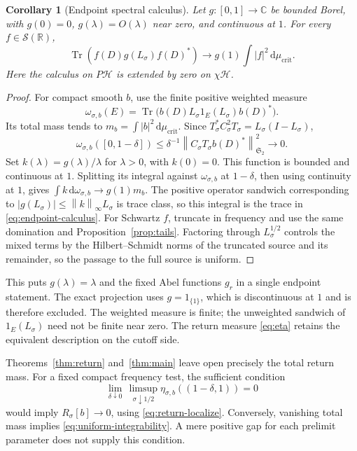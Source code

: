 \documentclass[11pt]{article}
\numberwithin{equation}{section}
\newtheorem{corollary}[theorem]{Corollary}
\theoremstyle{definition}
\theoremstyle{remark}
\newcommand{\HH}{\mathcal H}
\newcommand{\Sch}{\mathcal S}
\newcommand{\Tr}{\operatorname{Tr}}
\newcommand{\Id}{I}
\newcommand{\Stwo}{\mathfrak S_2}
\newcommand{\norm}[1]{\left\lVert #1\right\rVert}
\newcommand{\dd}{\,\mathrm d}
\newcommand{\mucrit}{\mu_{\mathrm{crit}}}
\begin{document}
\begin{corollary}[Endpoint spectral calculus]\label{cor:endpoint-calculus}
Let \(g:[0,1]\to\mathbb C\) be bounded Borel, with \(g(0)=0\),
\(g(\lambda)=O(\lambda)\) near zero, and continuous at \(1\).
For every \(f\in\Sch(\mathbb R)\),
\begin{equation}\label{eq:endpoint-calculus}
\Tr(f(D)g(L_\sigma)f(D)^*)
\longrightarrow g(1)\int|f|^2\dd\mucrit.
\end{equation}
Here the calculus on \(P\HH\) is extended by zero on \(\chi\HH\).
\end{corollary}
\begin{proof}
For compact smooth \(b\), use the finite positive weighted measure
\[
\omega_{\sigma,b}(E)
=\Tr\bigl(b(D)L_\sigma1_E(L_\sigma)b(D)^*\bigr).
\]
Its total mass tends to \(m_b=\int|b|^2\dd\mucrit\).
Since \(T_\sigma^*C_\sigma^2T_\sigma=L_\sigma(\Id-L_\sigma)\),
\[
\omega_{\sigma,b}([0,1-\delta])
\le\delta^{-1}\norm{C_\sigma T_\sigma b(D)^*}_{\Stwo}^2
\longrightarrow0.
\]
Set \(k(\lambda)=g(\lambda)/\lambda\) for \(\lambda>0\), with
\(k(0)=0\). This function is bounded and continuous at \(1\).
Splitting its integral against \(\omega_{\sigma,b}\) at
\(1-\delta\), then using continuity at \(1\), gives
\(\int k\dd\omega_{\sigma,b}\to g(1)m_b\).
The positive operator sandwich corresponding to
\(|g(L_\sigma)|\le\norm k_\infty L_\sigma\) is trace class,
so this integral is the trace in \eqref{eq:endpoint-calculus}.
For Schwartz \(f\), truncate in frequency and use the same domination
and Proposition~\ref{prop:tails}. Factoring through \(L_\sigma^{1/2}\)
controls the mixed terms by the Hilbert--Schmidt norms of the truncated
source and its remainder, so the passage to the full source is uniform.
\end{proof}

This puts \(g(\lambda)=\lambda\) and the fixed Abel functions
\(g_r\) in a single endpoint statement. The exact projection uses
\(g=1_{\{1\}}\), which is discontinuous at \(1\) and is therefore
excluded. The weighted measure is finite; the unweighted sandwich of
\(1_E(L_\sigma)\) need not be finite near zero. The return measure
\eqref{eq:eta} retains the equivalent description on the cutoff side.

Theorems~\ref{thm:return} and~\ref{thm:main} leave open precisely
the total return mass. For a fixed compact frequency test, the
sufficient condition
\begin{equation}\label{eq:uniform-integrability}
\lim_{\delta\downarrow0}\,
\limsup_{\sigma\downarrow1/2}
\eta_{\sigma,b}((1-\delta,1))=0
\end{equation}
would imply \(R_\sigma[b]\to0\), using
\eqref{eq:return-localize}. Conversely, vanishing total mass implies
\eqref{eq:uniform-integrability}. A mere positive gap for each
prelimit parameter does not supply this condition.
\end{document}
